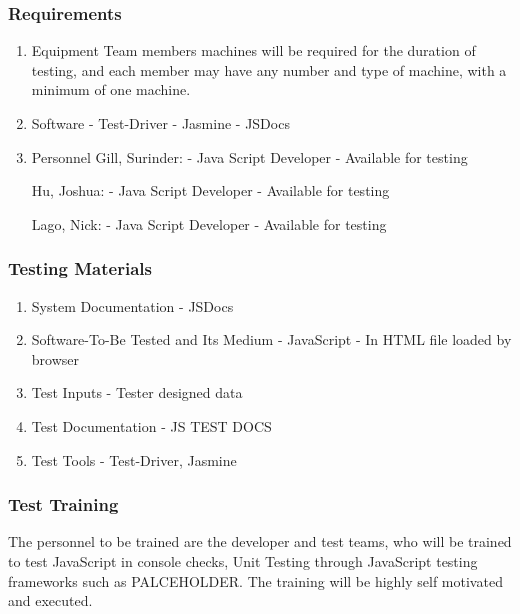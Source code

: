 \documentclass[11pt, oneside]{article}   	%
\begin{document}
\subsubsection{Requirements}
\begin{enumerate}[label=(\alph*)]
\item Equipment
\subitem Team members machines will be required for the duration of testing, and each member may have any number and type of machine, with a minimum of one machine.

\item Software
\subitem - Test-Driver
\subitem - Jasmine
\subitem - JSDocs

\item Personnel
\subitem Gill, Surinder:
\subsubitem - Java Script Developer
\subsubitem  - Available for testing

\subitem Hu, Joshua:
\subsubitem - Java Script Developer
\subsubitem - Available for testing

\subitem Lago, Nick:
\subsubitem - Java Script Developer
\subsubitem - Available for testing

\end{enumerate}

\subsubsection{Testing Materials}
\begin{enumerate}[label=(\alph*)]
\item System Documentation
\subitem - JSDocs

\item Software-To-Be Tested and Its Medium
\subitem - JavaScript
\subitem - In HTML file loaded by browser

\item Test Inputs
\subitem - Tester designed data

\item Test Documentation
\subitem - JS TEST DOCS

\item Test Tools
\subitem - Test-Driver, Jasmine

\end{enumerate}

\subsubsection{Test Training}
The personnel to be trained are the developer and test teams, who will be trained to test JavaScript in console checks, Unit Testing through JavaScript testing frameworks such as PALCEHOLDER. The training will be highly self motivated and executed.
\end{document}
